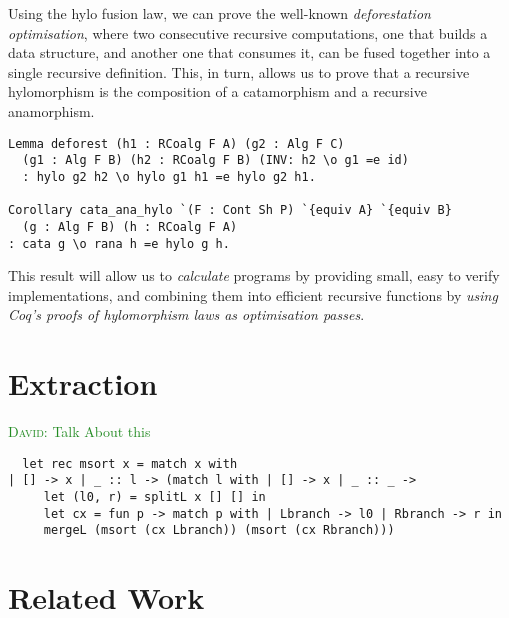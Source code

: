 \documentclass[a4paper, UKenglish, cleveref, autoref, thm-restate]{lipics-v2021}
\newcommand{\dcas}[1]{\textcolor{ForestGreen}{\textsc{David}: #1}}
\begin{document}
Using the hylo fusion law, we can prove the well-known \emph{deforestation
optimisation}, where two consecutive recursive computations, one that builds a
data structure, and another one that consumes it, can be fused together into a
single recursive definition. This, in turn, allows us to prove that a recursive
hylomorphism is the composition of a catamorphism and a recursive anamorphism.
\begin{verbatim}
Lemma deforest (h1 : RCoalg F A) (g2 : Alg F C)
  (g1 : Alg F B) (h2 : RCoalg F B) (INV: h2 \o g1 =e id)
  : hylo g2 h2 \o hylo g1 h1 =e hylo g2 h1.

Corollary cata_ana_hylo `(F : Cont Sh P) `{equiv A} `{equiv B}
  (g : Alg F B) (h : RCoalg F A)
: cata g \o rana h =e hylo g h.
\end{verbatim}
This result will allow us to \emph{calculate} programs by providing small, easy
to verify implementations, and combining them into efficient recursive
functions by \emph{using Coq's proofs of hylomorphism laws as optimisation
passes}.


\section{Extraction}

\dcas{Talk About this}
\begin{verbatim}
  let rec msort x = match x with
| [] -> x | _ :: l -> (match l with | [] -> x | _ :: _ ->
     let (l0, r) = splitL x [] [] in
     let cx = fun p -> match p with | Lbranch -> l0 | Rbranch -> r in
     mergeL (msort (cx Lbranch)) (msort (cx Rbranch)))
\end{verbatim}

\section{Related Work}
\end{document}

